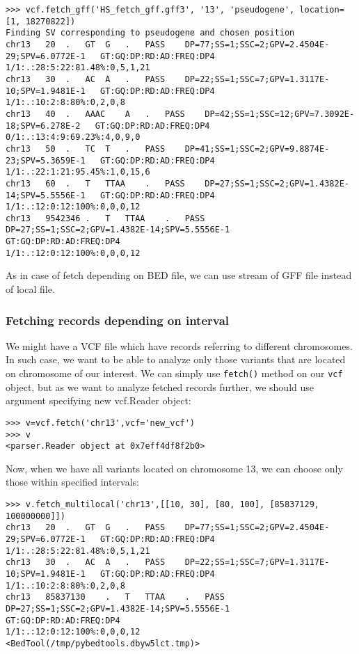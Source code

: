 \begin{verbatim}
>>> vcf.fetch_gff('HS_fetch_gff.gff3', '13', 'pseudogene', location=[1, 18270822])
Finding SV corresponding to pseudogene and chosen position
chr13	20	.	GT	G	.	PASS	DP=77;SS=1;SSC=2;GPV=2.4504E-29;SPV=6.0772E-1	GT:GQ:DP:RD:AD:FREQ:DP4
1/1:.:28:5:22:81.48%:0,5,1,21
chr13	30	.	AC	A	.	PASS	DP=22;SS=1;SSC=7;GPV=1.3117E-10;SPV=1.9481E-1	GT:GQ:DP:RD:AD:FREQ:DP4
1/1:.:10:2:8:80%:0,2,0,8
chr13	40	.	AAAC	A	.	PASS	DP=42;SS=1;SSC=12;GPV=7.3092E-18;SPV=6.278E-2	GT:GQ:DP:RD:AD:FREQ:DP4
0/1:.:13:4:9:69.23%:4,0,9,0
chr13	50	.	TC	T	.	PASS	DP=41;SS=1;SSC=2;GPV=9.8874E-23;SPV=5.3659E-1	GT:GQ:DP:RD:AD:FREQ:DP4
1/1:.:22:1:21:95.45%:1,0,15,6
chr13	60	.	T	TTAA	.	PASS	DP=27;SS=1;SSC=2;GPV=1.4382E-14;SPV=5.5556E-1	GT:GQ:DP:RD:AD:FREQ:DP4
1/1:.:12:0:12:100%:0,0,0,12
chr13	9542346	.	T	TTAA	.	PASS	DP=27;SS=1;SSC=2;GPV=1.4382E-14;SPV=5.5556E-1	GT:GQ:DP:RD:AD:FREQ:DP4
1/1:.:12:0:12:100%:0,0,0,12
\end{verbatim}


\noindent As in case of fetch depending on BED file, we can use stream of GFF file instead of local file.


\subsubsection{Fetching records depending on interval}


\noindent We might have a VCF file which have records referring to different chromosomes. In such case, we want to be able to
analyze only those variants that are located on chromosome of our interest. We can simply use \verb|fetch()| method
on our \verb|vcf| object, but as we want to analyze fetched records further, we should use argument specifying
new vcf.Reader object:


\begin{verbatim}
>>> v=vcf.fetch('chr13',vcf='new_vcf')
>>> v
<parser.Reader object at 0x7eff4df8f2b0>

\end{verbatim}


\noindent Now, when we have all variants located on chromosome 13, we can choose only those within specified intervals:


\begin{verbatim}
>>> v.fetch_multilocal('chr13',[[10, 30], [80, 100], [85837129, 100000000]])
chr13	20	.	GT	G	.	PASS	DP=77;SS=1;SSC=2;GPV=2.4504E-29;SPV=6.0772E-1	GT:GQ:DP:RD:AD:FREQ:DP4
1/1:.:28:5:22:81.48%:0,5,1,21
chr13	30	.	AC	A	.	PASS	DP=22;SS=1;SSC=7;GPV=1.3117E-10;SPV=1.9481E-1	GT:GQ:DP:RD:AD:FREQ:DP4
1/1:.:10:2:8:80%:0,2,0,8
chr13	85837130	.	T	TTAA	.	PASS	DP=27;SS=1;SSC=2;GPV=1.4382E-14;SPV=5.5556E-1	GT:GQ:DP:RD:AD:FREQ:DP4
1/1:.:12:0:12:100%:0,0,0,12
<BedTool(/tmp/pybedtools.dbyw5lct.tmp)>

\end{verbatim}


